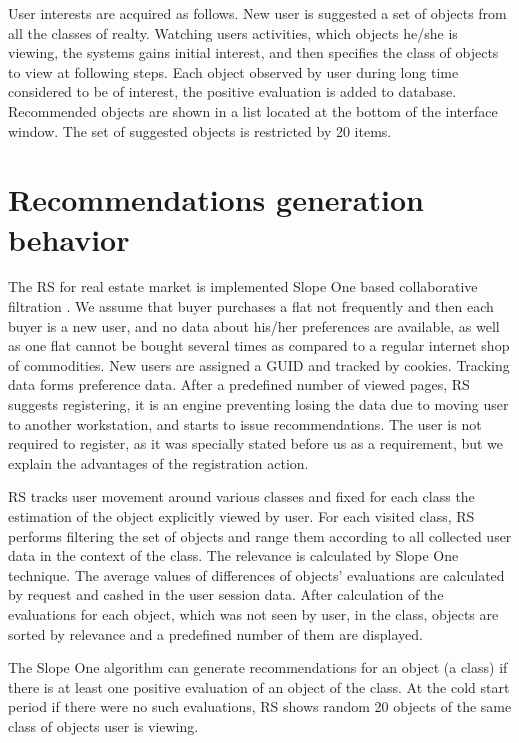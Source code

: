 \documentclass[conference]{IEEEtran}
\begin{document}
User interests are acquired as follows.  New user is suggested a set of objects from all the classes of realty.  Watching users activities, which objects he/she is viewing, the systems gains initial interest, and then specifies the class of objects to view at following steps.  Each object observed by user during long time considered to be of interest, the positive evaluation is added to database.  Recommended objects are shown in a list located at the bottom of the interface window.  The set of suggested objects is restricted by 20 items.

\section{Recommendations generation behavior}
\label{sec:proc-recs}

The RS for real estate market is implemented Slope One based collaborative filtration \cite{br1}.  We assume that buyer purchases a flat not frequently and then each buyer is a new user, and no data about his/her preferences are available, as well as one flat cannot be bought several times as compared to a regular internet shop of commodities.  New users are assigned a GUID and tracked by cookies.  Tracking data forms preference data.  After a predefined number of viewed pages, RS suggests registering, it is an engine preventing losing the data due to moving user to another workstation, and starts to issue recommendations.  The user is not required to register, as it was specially stated before us as a requirement, but we explain the advantages of the registration action.

RS tracks user movement around various classes and fixed for each class the estimation of the object explicitly viewed by user. For each visited class, RS performs filtering the set of objects and range them according to all collected user data in the context of the class.  The relevance is calculated by Slope One technique.  The average values of differences of objects' evaluations are calculated by request and cashed in the user session data. After calculation of the evaluations for each object, which was not seen by user, in the class, objects are sorted by relevance and a predefined number of them are displayed.

The Slope One algorithm can generate recommendations for an object (a class) if there is at least one positive evaluation of an object of the class.  At the cold start period if there were no such evaluations, RS shows random 20 objects of the same class of objects user is viewing.
\end{document}
